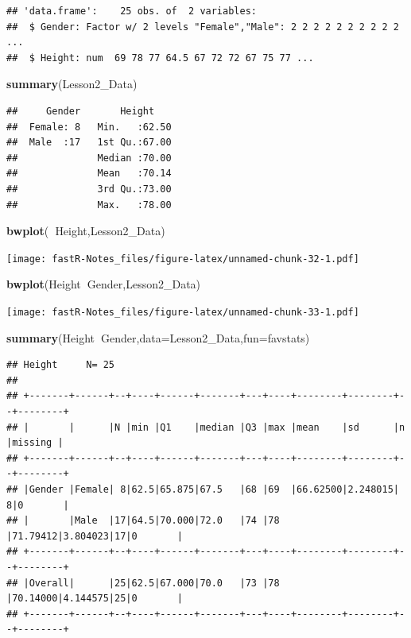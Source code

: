 \documentclass[]{book}
\newenvironment{Shaded}{\begin{snugshade}}{\end{snugshade}}
\newcommand{\KeywordTok}[1]{\textcolor[rgb]{0.13,0.29,0.53}{\textbf{#1}}}
\newcommand{\DataTypeTok}[1]{\textcolor[rgb]{0.13,0.29,0.53}{#1}}
\newcommand{\OperatorTok}[1]{\textcolor[rgb]{0.81,0.36,0.00}{\textbf{#1}}}
\newcommand{\NormalTok}[1]{#1}
\theoremstyle{definition}
\theoremstyle{definition}
\theoremstyle{definition}
\theoremstyle{remark}
\begin{document}
\begin{verbatim}
## 'data.frame':    25 obs. of  2 variables:
##  $ Gender: Factor w/ 2 levels "Female","Male": 2 2 2 2 2 2 2 2 2 2 ...
##  $ Height: num  69 78 77 64.5 67 72 72 67 75 77 ...
\end{verbatim}

\begin{Shaded}
\begin{Highlighting}[]
\KeywordTok{summary}\NormalTok{(Lesson2_Data)}
\end{Highlighting}
\end{Shaded}

\begin{verbatim}
##     Gender       Height     
##  Female: 8   Min.   :62.50  
##  Male  :17   1st Qu.:67.00  
##              Median :70.00  
##              Mean   :70.14  
##              3rd Qu.:73.00  
##              Max.   :78.00
\end{verbatim}

\begin{Shaded}
\begin{Highlighting}[]
\KeywordTok{bwplot}\NormalTok{(}\OperatorTok{~}\NormalTok{Height,Lesson2_Data)}
\end{Highlighting}
\end{Shaded}

\texttt{[image: fastR-Notes\_files/figure-latex/unnamed-chunk-32-1.pdf]}

\begin{Shaded}
\begin{Highlighting}[]
\KeywordTok{bwplot}\NormalTok{(Height}\OperatorTok{~}\NormalTok{Gender,Lesson2_Data)}
\end{Highlighting}
\end{Shaded}

\texttt{[image: fastR-Notes\_files/figure-latex/unnamed-chunk-33-1.pdf]}

\begin{Shaded}
\begin{Highlighting}[]
\KeywordTok{summary}\NormalTok{(Height}\OperatorTok{~}\NormalTok{Gender,}\DataTypeTok{data=}\NormalTok{Lesson2_Data,}\DataTypeTok{fun=}\NormalTok{favstats)}
\end{Highlighting}
\end{Shaded}

\begin{verbatim}
## Height     N= 25 
## 
## +-------+------+--+----+------+-------+---+----+--------+--------+--+--------+
## |       |      |N |min |Q1    |median |Q3 |max |mean    |sd      |n |missing |
## +-------+------+--+----+------+-------+---+----+--------+--------+--+--------+
## |Gender |Female| 8|62.5|65.875|67.5   |68 |69  |66.62500|2.248015| 8|0       |
## |       |Male  |17|64.5|70.000|72.0   |74 |78  |71.79412|3.804023|17|0       |
## +-------+------+--+----+------+-------+---+----+--------+--------+--+--------+
## |Overall|      |25|62.5|67.000|70.0   |73 |78  |70.14000|4.144575|25|0       |
## +-------+------+--+----+------+-------+---+----+--------+--------+--+--------+
\end{verbatim}
\end{document}
